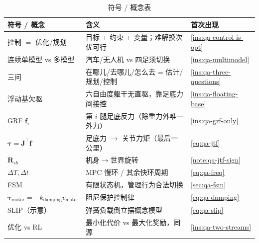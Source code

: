\begin{table}[H]\centering\small
\caption{符号 / 概念表}
\begin{tabular}{lll}
\toprule
符号 / 概念 & 含义 & 首次出现 \\
\midrule
控制 $=$ 优化/规划 & 目标 + 约束 + 变量；难解换次优可行 & \cref{ins:qa-control-is-opt} \\
连续单模型 vs 多模型 & 汽车/无人机 vs 四足须切换 & \cref{ins:qa-multimodel} \\
三问 & 在哪儿/去哪儿/怎么去 = 估计/规划/控制 & \cref{ins:qa-three-questions} \\
浮动基欠驱 & 六自由度躯干无直驱，靠足底力间接控 & \cref{ins:qa-floating-base} \\
GRF $\mathbf{f}_i$ & 第 $i$ 腿足底反力（除重力外唯一外力） & \cref{ins:qa-grf-only} \\
$\boldsymbol\tau=\mathbf{J}^\top\mathbf{f}$ & 足底力 $\to$ 关节力矩（最后一公里） & \cref{eq:qa-jtf} \\
$\mathbf{R}_{sb}$ & 机身$\to$世界旋转 & \cref{note:qa-jtf-sign} \\
$\Delta T,\Delta t$ & MPC 慢环 / 其余快环周期 & \cref{eq:qa-freq} \\
FSM & 有限状态机，管理行为合法切换 & \cref{sec:qa-fsm} \\
$\boldsymbol\tau_{\mathrm{motor}}=-k_{\mathrm{damping}}v_{\mathrm{motor}}$ & 阻尼保护控制律 & \cref{eq:qa-damping} \\
SLIP（示意） & 弹簧负载倒立摆概念模型 & \cref{eq:qa-slip} \\
优化 vs RL & 最小化代价 vs 最大化奖励，同源 & \cref{ins:qa-two-streams} \\
\bottomrule
\end{tabular}
\end{table}

